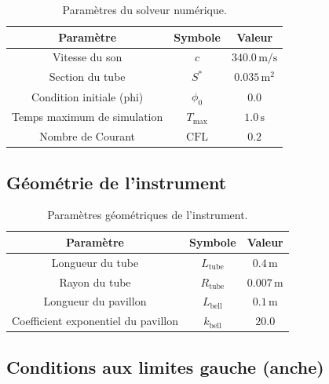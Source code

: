 \documentclass[12pt,a4paper]{article}
\begin{document}
\begin{table}[h!]
    \centering
    \begin{tabular}{|c|c|c|}
        \hline
        \textbf{Paramètre} & \textbf{Symbole} & \textbf{Valeur} \\
        \hline
        Vitesse du son & $c$ & $340.0 \, \text{m/s}$ \\
        \hline
        Section du tube & $S^*$ & $0.035 \, \text{m}^2$ \\
        \hline
        Condition initiale (phi) & $\phi_0$ & $0.0$ \\
        \hline
        Temps maximum de simulation & $T_{\max}$ & $1.0 \, \text{s}$ \\
        \hline
        Nombre de Courant & $\text{CFL}$ & $0.2$ \\
        \hline
    \end{tabular}
    \caption{Paramètres du solveur numérique.}
\end{table}

\subsection{Géométrie de l'instrument}

\begin{table}[h!]
    \centering
    \begin{tabular}{|c|c|c|}
        \hline
        \textbf{Paramètre} & \textbf{Symbole} & \textbf{Valeur} \\
        \hline
        Longueur du tube & $L_{\text{tube}}$ & $0.4 \, \text{m}$ \\
        \hline
        Rayon du tube & $R_{\text{tube}}$ & $0.007 \, \text{m}$ \\
        \hline
        Longueur du pavillon & $L_{\text{bell}}$ & $0.1 \, \text{m}$ \\
        \hline
        Coefficient exponentiel du pavillon & $k_{\text{bell}}$ & $20.0$ \\
        \hline
    \end{tabular}
    \caption{Paramètres géométriques de l'instrument.}
\end{table}

\subsection{Conditions aux limites gauche (anche)}
\end{document}
